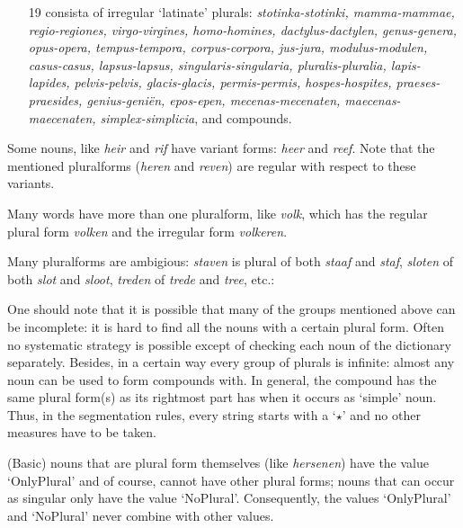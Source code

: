 \begin{itemize}
  \item [19] consista of irregular `latinate' plurals: {\em stotinka-stotinki, 
             mamma-mammae, regio-regiones, virgo-virgines, homo-homines, 
             dactylus-dactylen, genus-genera, opus-opera, tempus-tempora,
             corpus-corpora, jus-jura, modulus-modulen, casus-casus, 
             lapsus-lapsus, singularis-singularia, pluralis-pluralia, 
             lapis-lapides, pelvis-pelvis, glacis-glacis, permis-permis, 
             hospes-hospites, praeses-praesides, genius-geni\"{e}n, epos-epen, 
             mecenas-mecenaten, maecenas-maecenaten, simplex-simplicia},
             and compounds.
\end{itemize}

Some nouns, like {\em heir} and {\em rif} have variant forms: {\em heer} 
and {\em reef}.
Note that the mentioned pluralforms ({\em heren} and {\em reven}) 
are regular with respect to these variants.

Many words have more than one pluralform, like {\em volk}, which has the regular 
plural form {\em volken} and the irregular form {\em volkeren}.

Many pluralforms are ambigious: {\em staven} is plural of both {\em staaf} and 
{\em staf}, {\em sloten} of both {\em slot} and {\em sloot}, {\em treden} of 
{\em trede} and {\em tree}, etc.:

One should note that it is possible that many of the groups mentioned above
can be incomplete: it is hard to
find all the nouns with a certain plural form. Often no systematic strategy is
possible except of checking each noun of the dictionary separately. Besides, in
a certain way every group of plurals is infinite: almost any noun can be used to
form compounds with. In general, the compound has the same plural form(s) as its
rightmost part has when it occurs as `simple' noun. Thus, in the segmentation 
rules, every string starts with a `$\star$' 
and no other measures have to be taken.

(Basic) nouns that are plural form themselves (like {\em hersenen}) have the 
value
`OnlyPlural' and of course, cannot have other plural forms; nouns that can occur
as singular only have the value `NoPlural'. Consequently, the values
`OnlyPlural' and `NoPlural' never combine with other values. 

